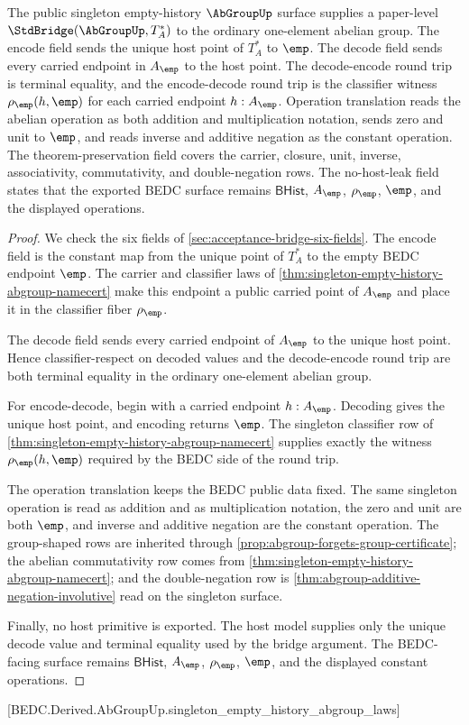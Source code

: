 \begin{theorem}
\label{thm:abgroup-singleton-terminal-standard-bridge}
The public singleton empty-history $\AbGroupUp$ surface supplies a paper-level
$\StdBridge(\AbGroupUp,T_A^\ast)$ to the ordinary one-element abelian group.
The encode field sends the unique host point of $T_A^\ast$ to $\emp$. The
decode field sends every carried endpoint in $A_{\emp}$ to the host point. The
decode-encode round trip is terminal equality, and the encode-decode round trip
is the classifier witness $\rho_{\emp}(h,\emp)$ for each carried endpoint
$h:A_{\emp}$. Operation translation reads the abelian operation as both
addition and multiplication notation, sends zero and unit to $\emp$, and reads
inverse and additive negation as the constant operation. The theorem-preservation
field covers the carrier, closure, unit, inverse, associativity, commutativity,
and double-negation rows. The no-host-leak field states that the exported BEDC
surface remains $\mathsf{BHist}$, $A_{\emp}$, $\rho_{\emp}$, $\emp$, and the
displayed operations.
\end{theorem}
\begin{proof}
We check the six fields of \autoref{sec:acceptance-bridge-six-fields}. The
encode field is the constant map from the unique point of $T_A^\ast$ to the
empty BEDC endpoint $\emp$. The carrier and classifier laws of
\autoref{thm:singleton-empty-history-abgroup-namecert} make this endpoint a
public carried point of $A_{\emp}$ and place it in the classifier fiber
$\rho_{\emp}$.

The decode field sends every carried endpoint of $A_{\emp}$ to the unique host
point. Hence classifier-respect on decoded values and the decode-encode round
trip are both terminal equality in the ordinary one-element abelian group.

For encode-decode, begin with a carried endpoint $h:A_{\emp}$. Decoding gives
the unique host point, and encoding returns $\emp$. The singleton classifier row
of \autoref{thm:singleton-empty-history-abgroup-namecert} supplies exactly the
witness $\rho_{\emp}(h,\emp)$ required by the BEDC side of the round trip.

The operation translation keeps the BEDC public data fixed. The same singleton
operation is read as addition and as multiplication notation, the zero and unit
are both $\emp$, and inverse and additive negation are the constant operation.
The group-shaped rows are inherited through
\autoref{prop:abgroup-forgets-group-certificate}; the abelian commutativity row
comes from \autoref{thm:singleton-empty-history-abgroup-namecert}; and the
double-negation row is \autoref{thm:abgroup-additive-negation-involutive} read on
the singleton surface.

Finally, no host primitive is exported. The host model supplies only the unique
decode value and terminal equality used by the bridge argument. The BEDC-facing
surface remains $\mathsf{BHist}$, $A_{\emp}$, $\rho_{\emp}$, $\emp$, and the
displayed constant operations.
\end{proof}



[BEDC.Derived.AbGroupUp.singleton\_empty\_history\_abgroup\_laws]
